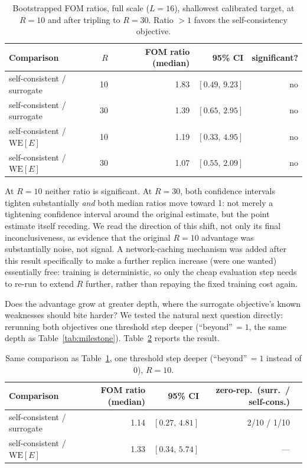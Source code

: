 \documentclass[a4paper,fleqn]{cas-sc}
\begin{document}
\begin{table}[H]
\centering\small
\caption{Bootstrapped FOM ratios, full scale ($L=16$), shallowest calibrated target, at
	$R=10$ and after tripling to $R=30$. Ratio $>1$ favors the self-consistency objective.}
\label{tab:kimcaiboot}
\begin{tabular}{lrrrr}
	\toprule
	Comparison & $R$ & FOM ratio (median) & 95\% CI & significant? \\
	\midrule
	self-consistent / surrogate & 10 & 1.83 & $[0.49,\,9.23]$ & no \\
	self-consistent / surrogate & 30 & 1.39 & $[0.65,\,2.95]$ & no \\
	self-consistent / $\mathrm{WE}[E]$ & 10 & 1.19 & $[0.33,\,4.95]$ & no \\
	self-consistent / $\mathrm{WE}[E]$ & 30 & 1.07 & $[0.55,\,2.09]$ & no \\
	\bottomrule
\end{tabular}
\end{table}

At $R=10$ neither ratio is significant. At $R=30$, both confidence intervals tighten
substantially \emph{and} both median ratios move toward 1: not merely a tightening
confidence interval around the original estimate, but the point estimate itself receding.
We read the direction of this shift, not only its final inconclusiveness, as evidence that
the original $R=10$ advantage was substantially noise, not signal. A network-caching
mechanism was added after this result specifically to make a further replica increase (were
one wanted) essentially free: training is deterministic, so only the cheap evaluation step
needs to re-run to extend $R$ further, rather than repaying the fixed training cost again.

Does the advantage grow at greater depth, where the surrogate objective's known
	weaknesses should bite harder? We tested the natural next question directly: rerunning
both objectives one threshold step deeper (``beyond''\,$=1$, the same depth as
Table~\ref{tab:milestone}). Table~\ref{tab:kimcaideep} reports the result.

\begin{table}[H]
\centering\small
\caption{Same comparison as Table~\ref{tab:kimcaiboot}, one threshold step deeper
	(``beyond''\,$=1$ instead of $0$), $R=10$.}
\label{tab:kimcaideep}
\begin{tabular}{lrrrr}
	\toprule
	Comparison & FOM ratio (median) & 95\% CI & zero-rep.\ (surr.\ / self-cons.) \\
	\midrule
	self-consistent / surrogate & 1.14 & $[0.27,\,4.81]$ & 2/10 / 1/10 \\
	self-consistent / $\mathrm{WE}[E]$ & 1.33 & $[0.34,\,5.74]$ & --- \\
	\bottomrule
\end{tabular}
\end{table}
\end{document}
